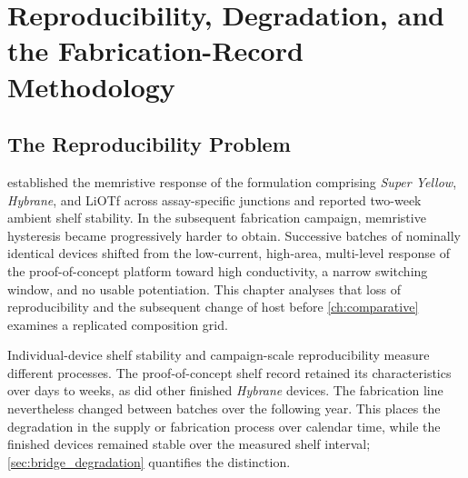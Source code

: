 \documentclass[12pt, twoside]{report}
\begin{document}
  \setcounter{chapter}{2}     %
\fi

\providecommand{\SY}{\textit{Super Yellow}}
\providecommand{\Hybrane}{\textit{Hybrane}}
\providecommand{\PEO}{PEO}
\providecommand{\LiTf}{LiOTf}
\providecommand{\ITO}{ITO}
\providecommand{\twoterminal}{two-terminal}
\providecommand{\siBridgeRef}[1]{\ifdefined\thesismode\cref{#1}\else Appendix~B\fi}

\chapter{Reproducibility, Degradation, and the Fabrication-Record Methodology}\label{ch:bridge}

\section{The Reproducibility Problem}\label{sec:bridge_problem}

 established the memristive response of the formulation comprising \SY{}, \Hybrane{}, and \LiTf{} across assay-specific junctions and reported two-week ambient shelf stability. In the subsequent fabrication campaign, memristive hysteresis became progressively harder to obtain. Successive batches of nominally identical devices shifted from the low-current, high-area, multi-level response of the proof-of-concept platform toward high conductivity, a narrow switching window, and no usable potentiation. This chapter analyses that loss of reproducibility and the subsequent change of host before \cref{ch:comparative} examines a replicated composition grid.

Individual-device shelf stability and campaign-scale reproducibility measure different processes. The proof-of-concept shelf record retained its characteristics over days to weeks, as did other finished \Hybrane{} devices. The fabrication line nevertheless changed between batches over the following year. This places the degradation in the supply or fabrication process over calendar time, while the finished devices remained stable over the measured shelf interval; \cref{sec:bridge_degradation} quantifies the distinction.
\end{document}
